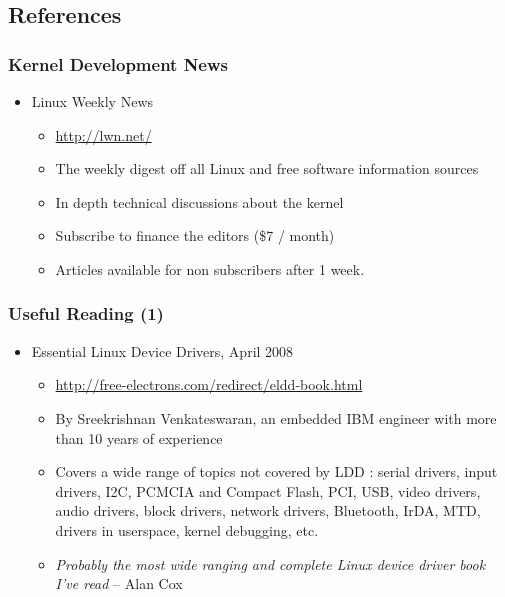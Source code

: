 \subsection{References}

\begin{frame}
  \frametitle{Kernel Development News}
  \begin{itemize}
  \item Linux Weekly News
    \begin{itemize}
    \item \url{http://lwn.net/}
    \item The weekly digest off all Linux and free software
      information sources
    \item In depth technical discussions about the kernel
    \item Subscribe to finance the editors (\$7 / month)
    \item Articles available for non subscribers after 1 week.
    \end{itemize}
  \end{itemize}
\end{frame}

\begin{frame}
  \frametitle{Useful Reading (1)}
  \begin{itemize}
  \item Essential Linux Device Drivers, April 2008
    \begin{itemize}
    \item \url{http://free-electrons.com/redirect/eldd-book.html}
    \item By Sreekrishnan Venkateswaran, an embedded IBM engineer with
      more than 10 years of experience
    \item Covers a wide range of topics not covered by LDD : serial
      drivers, input drivers, I2C, PCMCIA and Compact Flash, PCI, USB,
      video drivers, audio drivers, block drivers, network drivers,
      Bluetooth, IrDA, MTD, drivers in userspace, kernel debugging,
      etc.
    \item \emph{Probably the most wide ranging and complete Linux
        device driver book I've read} -- Alan Cox
    \end{itemize}
  \end{itemize}
\end{frame}

